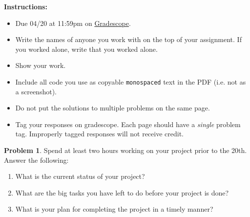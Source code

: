 \documentclass[12pt]{article}
\theoremstyle{definition}
\newtheorem{problem}{Problem}
\begin{document}
    \textbf{\Large{}}
    
    \vspace{-1.8em}
    \hrulefill
 
\textbf{Instructions:}
    \begin{itemize}
        \item Due 04/20 at 11:59pm on \href{https://www.gradescope.com/courses/487363/}{Gradescope}.
        \item Write the names of anyone you work with on the top of your assignment. If you worked alone, write that you worked alone.
        \item Show your work.
        \item Include all code you use as copyable \verb|monospaced| text in the PDF (i.e. not as a screenshot).
        \item Do not put the solutions to multiple problems on the same page.
        \item Tag your responses on gradescope. Each page should have a \emph{single} problem tag. Improperly tagged responses will not receive credit.
\end{itemize}
    
\vspace{2em}

\begin{problem}
    Spend at least two hours working on your project prior to the 20th. 
    Answer the following:
    \begin{enumerate}
        \item What is the current status of your project? 
        \item What are the big tasks you have left to do before your project is done?
        \item What is your plan for completing the project in a timely manner?
    \end{enumerate}
\end{problem}
\end{document}

